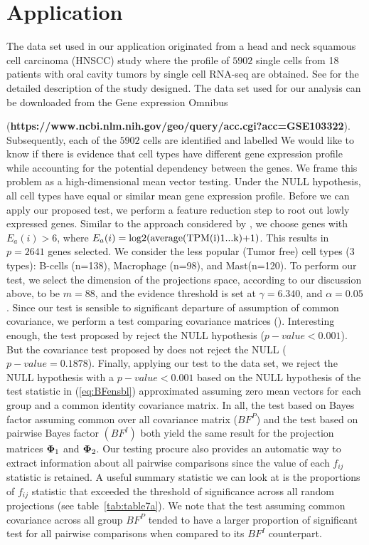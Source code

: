 \documentclass[12pt]{article}
\theoremstyle{plain}%
\theoremstyle{definition}
\def\log{\hbox{log}}
\def\log{\hbox{log}}
\newcommand{\uPhi}              {\mbox{\boldmath$\Phi$}}
\begin{document}
\section{Application} \label{sec:Application}
The data set used in our application originated from a head and neck squamous cell carcinoma (HNSCC) study where the profile of $5902$ single cells from 18 patients with oral cavity tumors by single cell RNA-seq are obtained. See \citep{puram2017single} for the detailed description of the study designed. The data set used for our analysis can be downloaded from the Gene expression Omnibus 

(\textbf{https://www.ncbi.nlm.nih.gov/geo/query/acc.cgi?acc=GSE103322}). Subsequently, each of the $5902$ cells are identified and labelled %
We would like to know if there is evidence that cell types have different gene expression profile while accounting for the potential dependency between the genes. We frame this problem as a high-dimensional mean vector testing. Under the NULL hypothesis, all cell types have equal or similar mean gene expression profile. Before we can apply our proposed test, we perform a feature reduction step to root out lowly expressed genes. Similar to the approach considered by \cite{puram2017single}, we choose genes with $E_a(i) > 6$, where $E_a(i)=\log2\text{(average(TPM(i)1...k)+1)}$. This results in $p = 2641$ genes selected. We consider the less popular (Tumor free) cell types (3 types): B-cells (n=138),  Macrophage (n=98), and Mast(n=120). To perform our test, we select the dimension of the projections space, according to our discussion above, to be $m = 88$, and the evidence threshold is set at $\gamma = 6.340$, and $\alpha = 0.05$. Since our test is sensible to significant departure of assumption of common covariance, we perform a test comparing covariance matrices (\citealp{ahmad2017location,srivastava2010testing}). Interesting enough, the test proposed by \citealt{ahmad2017location} reject the NULL hypothesis ($p-value < 0.001$). But the covariance test proposed by \cite{srivastava2010testing} does not reject the NULL ($p-value = 0.1878$). 
Finally, applying our test to the data set, we reject the NULL hypothesis with a $p-value < 0.001$ based on the NULL hypothesis of the test statistic in (\ref{eq:BFensbl}) approximated assuming zero mean vectors for each group and a common identity covariance matrix. In all, the test based on Bayes factor assuming common over all covariance matrix ($BF^{P}$) and the test based on pairwise Bayes factor $(BF^{I})$ both yield the same result for the projection matrices $\uPhi_1$ and $\uPhi_2$. 
Our testing procure also provides an automatic way to extract information about all pairwise comparisons since the value of each $f_{ij}$ statistic is retained. A useful summary statistic we can look at is the proportions of $f_{ij}$ statistic that exceeded the threshold of significance across all random projections (see table~\ref{tab:table7a}). We note that the test assuming common covariance across all group $BF^{P}$ tended to have a larger proportion of significant test for all pairwise comparisons when compared to its $BF^{I}$ counterpart.  
\end{document}
